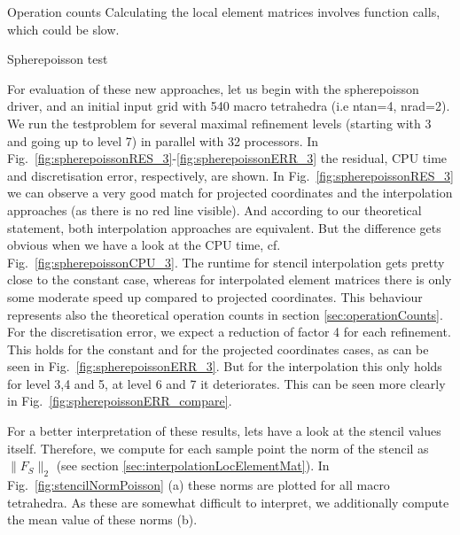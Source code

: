 \documentclass[a4paper,11pt,reqno]{amsart}
\numberwithin{figure}{section}
\numberwithin{table}{section}
\numberwithin{figure}{section}
\begin{document}
\begin{section}{Operation counts}
Calculating the local element matrices involves function calls, which could be slow.\\

\end{section}







\begin{section}{Spherepoisson test}



For evaluation of these new approaches, let us begin with the spherepoisson driver, 
and an initial input grid with 
540 macro tetrahedra (i.e ntan=4, nrad=2). We run the testproblem for several
maximal refinement levels (starting with 3 and going up to level 7) in parallel
with 32 processors. In Fig.~\ref{fig:spherepoissonRES_3}-\ref{fig:spherepoissonERR_3}
the residual, CPU time and discretisation error, respectively, are shown.
In Fig.~\ref{fig:spherepoissonRES_3} we can observe a very good match for
projected coordinates and the interpolation
approaches (as there is no red line visible).
And according to our theoretical statement, both interpolation approaches are
equivalent. But the difference gets obvious when we have a look at the CPU time,
cf. Fig.~\ref{fig:spherepoissonCPU_3}. The runtime for stencil interpolation
gets pretty close to the constant case, whereas for interpolated element matrices
there is only some moderate speed up compared to projected coordinates.
This behaviour represents also the theoretical operation counts in section 
\ref{sec:operationCounts}.
For the discretisation error, we expect a reduction
of factor 4 for each refinement. This holds for the constant and for the projected
coordinates cases, as can be seen in Fig.~\ref{fig:spherepoissonERR_3}. But for
the interpolation this only holds for level 3,4 and 5, at level 6 and 7 it deteriorates.
This can be seen more clearly in Fig.~\ref{fig:spherepoissonERR_compare}.

For a better interpretation of these results, lets have a look at the stencil values itself.
Therefore, we compute for each sample point the norm of the stencil as $\|F_S\|_2$ 
(see section \ref{sec:interpolationLocElementMat}).
In Fig.~\ref{fig:stencilNormPoisson} (a) these norms are plotted for all macro tetrahedra.
As these are somewhat difficult to interpret, we additionally compute the mean value
of these norms (b). 


\end{section}
\end{document}
